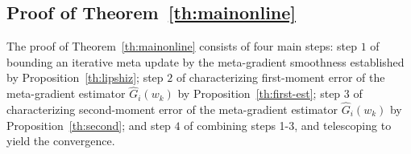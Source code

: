 \documentclass{osudissert96}
\begin{document}

\subsection*{Proof of Theorem~\ref{th:mainonline}}
 The proof of Theorem~\ref{th:mainonline} consists of four main steps: step $1$ of bounding an iterative meta update by the meta-gradient smoothness established by Proposition~\ref{th:lipshiz}; step $2$ of characterizing first-moment  error of the meta-gradient estimator { $\widehat G_i(w_k)$} by Proposition~\ref{th:first-est}; step $3$ of characterizing second-moment  error of the meta-gradient estimator { $\widehat G_i(w_k)$} by Proposition~\ref{th:second}; and step $4$ of combining steps 1-3, and telescoping to yield the convergence. 
 
\end{document}
